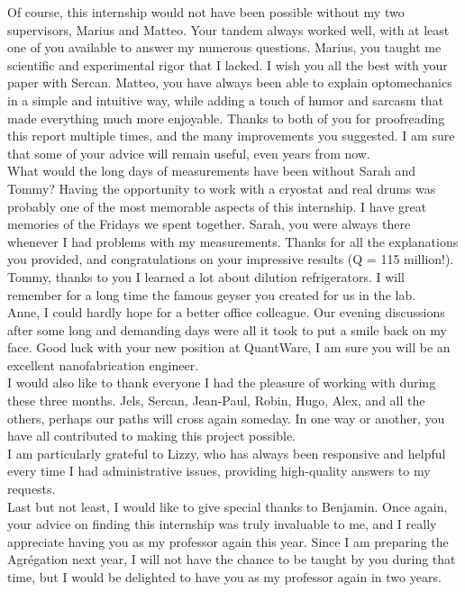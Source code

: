 \documentclass[11pt,a4pape,longbibliography]{article}
\begin{document}
Of course, this internship would not have been possible without my two supervisors, Marius and Matteo. Your tandem always worked well, with at least one of you available to answer my numerous questions. Marius, you taught me scientific and experimental rigor that I lacked. I wish you all the best with your paper with Sercan. Matteo, you have always been able to explain optomechanics in a simple and intuitive way, while adding a touch of humor and sarcasm that made everything much more enjoyable. Thanks to both of you for proofreading this report multiple times, and the many improvements you suggested. I am sure that some of your advice will remain useful, even years from now.\\

What would the long days of measurements have been without Sarah and Tommy? Having the opportunity to work with a cryostat and real drums was probably one of the most memorable aspects of this internship. I have great memories of the Fridays we spent together. Sarah, you were always there whenever I had problems with my measurements. Thanks for all the explanations you provided, and congratulations on your impressive results (Q = 115 million!). Tommy, thanks to you I learned a lot about dilution refrigerators. I will remember for a long time the famous geyser you created for us in the lab.\\

Anne, I could hardly hope for a better office colleague. Our evening discussions after some long and demanding days were all it took to put a smile back on my face. Good luck with your new position at QuantWare, I am sure you will be an excellent nanofabrication engineer.\\

I would also like to thank everyone I had the pleasure of working with during these three months. Jels, Sercan, Jean-Paul, Robin, Hugo, Alex, and all the others, perhaps our paths will cross again someday. In one way or another, you have all contributed to making this project possible.\\

I am particularly grateful to Lizzy, who has always been responsive and helpful every time I had administrative issues, providing high-quality answers to my requests.\\

Last but not least, I would like to give special thanks to Benjamin. Once again, your advice on finding this internship was truly invaluable to me, and I really appreciate having you as my professor again this year. Since I am preparing the Agrégation next year, I will not have the chance to be taught by you during that time, but I would be delighted to have you as my professor again in two years.\\
\end{document}
